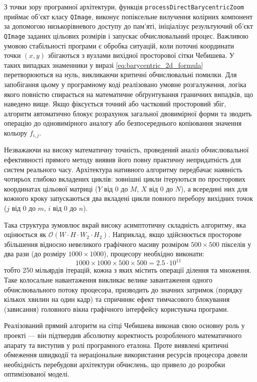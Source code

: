 З точки зору програмної архітектури, функція \texttt{processDirectBarycentricZoom} приймає об'єкт класу \texttt{QImage}, виконує попіксельне вилучення колірних компонент за допомогою низькорівневого доступу до пам'яті, ініціалізує результуючий об'єкт \texttt{QImage} заданих цільових розмірів і запускає обчислювальний процес. Важливою умовою стабільності програми є обробка ситуацій, коли поточні координати точки $(x, y)$ збігаються з вузлами вихідної просторової сітки Чебишева. У таких випадках знаменники у виразі \eqref{eq:barycentric_2d_formula} перетворюються на нуль, викликаючи критичні обчислювальні помилки. Для запобігання цьому у програмному коді реалізовано умовне розгалуження, логіка якого повністю спирається на математичне обґрунтування граничних випадків, що наведено вище. Якщо фіксується точний або частковий просторовий збіг, алгоритм автоматично блокує розрахунок загальної двовимірної форми та зводить операцію до одновимірного аналогу або безпосереднього копіювання значення кольору $f_{i,j}$.

Незважаючи на високу математичну точність, проведений аналіз обчислювальної ефективності прямого методу виявив його повну практичну непридатність для систем реального часу. Архітектура нативного алгоритму передбачає наявність чотирьох глибоко вкладених циклів: зовнішні цикли ітеруються по просторових координатах цільової матриці ($Y$ від $0$ до $M$, $X$ від $0$ до $N$), а всередині них для кожного кроку запускаються два вкладені цикли повного перебору вихідних точок ($j$ від $0$ до $m$, $i$ від $0$ до $n$). 

Така структура зумовлює вкрай високу асимптотичну складність алгоритму, яка оцінюється як $\mathcal{O}(W \cdot H \cdot W_2 \cdot H_2)$. Наприклад, якщо здійснюється просторове збільшення відносно невеликого графічного масиву розміром $500 \times 500$ пікселів у два рази (до розміру $1000 \times 1000$), процесору необхідно виконати:
\begin{equation}\label{eq:complexity_calc}
	1000 \times 1000 \times 500 \times 500 = 2.5 \cdot 10^{11}
\end{equation}
тобто 250 мільярдів ітерацій, кожна з яких містить операції ділення та множення. Таке колосальне навантаження викликає велике завантаження одного обчислювального потоку процесора, призводить до значних затримок (порядку кількох хвилин на один кадр) та спричиняє ефект тимчасового блокування (зависання) головного вікна графічного інтерфейсу користувача програми.

Реалізований прямий алгоритм на сітці Чебишева виконав свою основну роль у проекті — він підтвердив абсолютну коректность розробленого математичного апарату та виступив у ролі програмного еталона. Проте виявлені критичні обмеження швидкодії та нераціональне використання ресурсів процесора довели необхідність перебудови архітектури обчислень, що привело до розробки оптимізованої моделі.